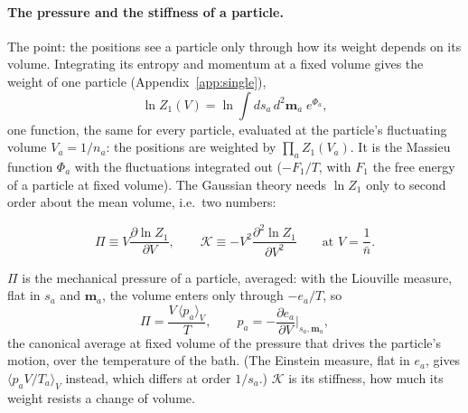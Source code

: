 \documentclass[11pt,aps,preprint,nofootinbib,superscriptaddress,tightenlines]{revtex4-2}
\newcommand{\avg}[1]{\langle #1\rangle}
\def\st{\begin{equation}}
\def\stp{\end{equation}}
\def\App#1{Appendix~\ref{#1}}
\let\oldparagraph\paragraph
\renewcommand{\paragraph}{\par\bigskip\oldparagraph}
\begin{document}
\paragraph{The pressure and the stiffness of a particle.}  The point: the positions see a particle only through how its weight depends on its volume.
Integrating its entropy and momentum at a fixed volume gives the weight of one particle (\App{app:single}),
\st
\ln Z_1(V)=\ln\int ds_a\,d^2\bm m_a\;e^{\Phi_a},
\label{phidef}
\stp
one function, the same for every particle, evaluated at the particle's fluctuating volume $V_a=1/n_a$: the positions are weighted by
$\prod_aZ_1(V_a)$.  It is the Massieu function $\Phi_a$ with the fluctuations integrated out ($-F_1/T$, with $F_1$ the free energy of a particle at fixed volume).  The Gaussian
theory needs $\ln Z_1$ only to second order about the mean volume, i.e.\ two numbers:
\begin{keyeq}
\st
\Pi\equiv V\frac{\partial\ln Z_1}{\partial V},\qquad \mathcal K\equiv-V^2\frac{\partial^2\ln Z_1}{\partial V^2}\qquad\text{at }V=\frac1{\bar n} .
\label{PiKdef}
\stp
\end{keyeq}
$\Pi$ is the mechanical pressure of a particle, averaged: with the Liouville measure, flat in $s_a$ and $\bm m_a$, the volume enters only through
$-e_a/T$, so
\st
\Pi=\frac{V\,\avg{p_a}_V}{T},\qquad p_a=-\frac{\partial e_a}{\partial V}\Big|_{s_a,\bm m_a},
\stp
the canonical average at fixed volume of the pressure that drives the particle's motion, over the temperature of the bath.  (The Einstein measure,
flat in $e_a$, gives $\avg{p_aV/T_a}_V$ instead, which differs at order $1/s_a$.)  $\mathcal K$ is its stiffness, how much its weight resists a change
of volume.
\end{document}
